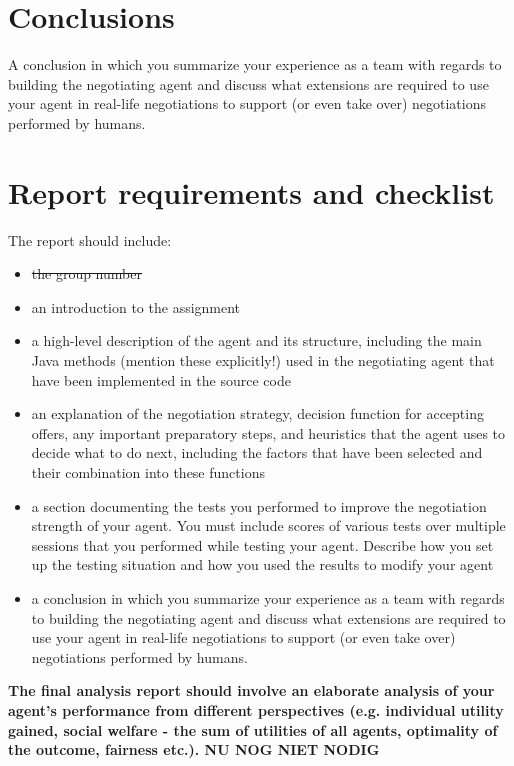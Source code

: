 \documentclass[11pt,a4paper]{report}
\begin{document}
\section*{Conclusions}

A conclusion in which you summarize your experience as a team with regards to building the
negotiating agent and discuss what extensions are required to use your agent in real-life negotiations to support (or even take over) negotiations performed by humans.

\newpage

\section*{Report requirements and checklist}

The report should include:\\
\begin{itemize}
\item \st{the group number}
\item an introduction to the assignment
\item a high-level description of the agent and its structure, including the main Java methods (mention
these explicitly!) used in the negotiating agent that have been implemented in the source code
\item an explanation of the negotiation strategy, decision function for accepting offers, any important
preparatory steps, and heuristics that the agent uses to decide what to do next, including the factors
that have been selected and their combination into these functions
\item a section documenting the tests you performed to improve the negotiation strength of your agent.
You must include scores of various tests over multiple sessions that you performed while testing
your agent. Describe how you set up the testing situation and how you used the results to modify
your agent
\item a conclusion in which you summarize your experience as a team with regards to building the
negotiating agent and discuss what extensions are required to use your agent in real-life negotiations
to support (or even take over) negotiations performed by humans.
\end{itemize}

\textbf{The final analysis report should involve an elaborate analysis of your agent's performance from different perspectives (e.g. individual utility gained, social welfare - the sum of utilities of all agents, optimality of the outcome, fairness etc.). NU NOG NIET NODIG}
\end{document}
